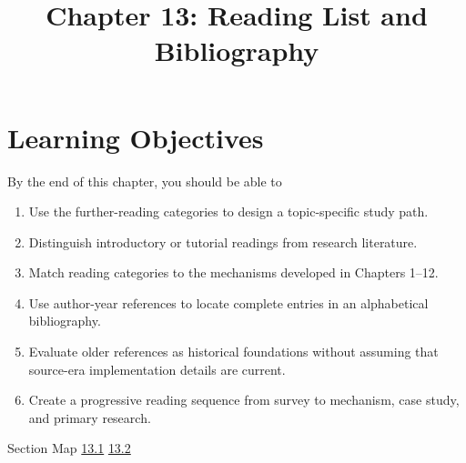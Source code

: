 \documentclass[10pt,letterpaper]{article}
\title{Chapter 13: Reading List and Bibliography}
\author{}
\date{}
\begin{document}
\maketitle
\section*{Learning Objectives}
\begin{studybox}{By the end of this chapter, you should be able to}
\begin{enumerate}
  \item Use the further-reading categories to design a topic-specific study path.
  \item Distinguish introductory or tutorial readings from research literature.
  \item Match reading categories to the mechanisms developed in Chapters 1--12.
  \item Use author-year references to locate complete entries in an alphabetical bibliography.
  \item Evaluate older references as historical foundations without assuming that source-era implementation details are current.
  \item Create a progressive reading sequence from survey to mechanism, case study, and primary research.
\end{enumerate}
\end{studybox}

\begin{studybox}{Section Map}
\hyperlink{sec-13-1}{13.1} \quad \hyperlink{sec-13-2}{13.2}
\end{studybox}
\end{document}
